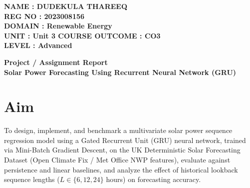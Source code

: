 \documentclass[12pt,a4paper]{article}
\begin{document}
\begin{flushright}
\textbf{NAME : DUDEKULA THAREEQ} \\
\textbf{REG NO : 2023008156} \\
\textbf{DOMAIN : Renewable Energy} \\
\textbf{UNIT : Unit 3 \quad COURSE OUTCOME : CO3} \\
\textbf{LEVEL : Advanced}
\end{flushright}

\vspace{0.5cm}

\begin{center}
\Large \textbf{Project / Assignment Report} \\
\vspace{0.2cm}
\LARGE \textbf{Solar Power Forecasting Using Recurrent Neural Network (GRU)}
\end{center}

\vspace{0.4cm}

\section*{Aim}
To design, implement, and benchmark a multivariate solar power sequence regression model using a Gated Recurrent Unit (GRU) neural network, trained via Mini-Batch Gradient Descent, on the UK Deterministic Solar Forecasting Dataset (Open Climate Fix / Met Office NWP features), evaluate against persistence and linear baselines, and analyze the effect of historical lookback sequence lengths ($L \in \{6, 12, 24\}$ hours) on forecasting accuracy.
\end{document}
